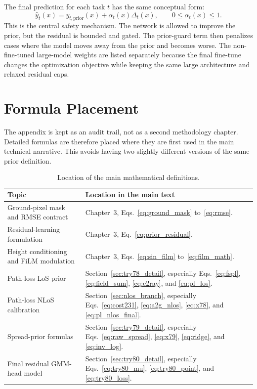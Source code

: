 The final prediction for each task \(t\) has the same conceptual form:
\[
  \hat y_t(x) = y_{t,\mathrm{prior}}(x) + \alpha_t(x)\Delta_t(x),
  \qquad 0 \le \alpha_t(x) \le 1.
\]
This is the central safety mechanism. The network is allowed to improve the
prior, but the residual is bounded and gated. The prior-guard term then
penalizes cases where the model moves away from the prior and becomes worse.
The non-fine-tuned large-model weights are listed separately because the final
fine-tune changes the optimization objective while keeping the same large
architecture and relaxed residual caps.

\chapter{Formula Placement}

The appendix is kept as an audit trail, not as a second methodology chapter.
Detailed formulas are therefore placed where they are first used in the main
technical narrative. This avoids having two slightly different versions of the
same prior definition.

\begin{table}[ht]
\centering
\caption{Location of the main mathematical definitions.}
\label{tab:formula_location_appendix}
\begin{tabularx}{\textwidth}{lX}
\toprule
Topic & Location in the main text \\
\midrule
Ground-pixel mask and RMSE contract &
Chapter~3, Eqs.~\ref{eq:ground_mask} to~\ref{eq:rmse}. \\
Residual-learning formulation &
Chapter~3, Eq.~\ref{eq:prior_residual}. \\
Height conditioning and FiLM modulation &
Chapter~3, Eqs.~\ref{eq:sin_film} to~\ref{eq:film_math}. \\
Path-loss LoS prior &
Section~\ref{sec:try78_detail}, especially Eqs.~\ref{eq:fspl},
\ref{eq:field_sum}, \ref{eq:c2ray}, and \ref{eq:pl_los}. \\
Path-loss NLoS calibration &
Section~\ref{sec:nlos_branch}, especially Eqs.~\ref{eq:cost231},
\ref{eq:a2g_nlos}, \ref{eq:x78}, and \ref{eq:pl_nlos_final}. \\
Spread-prior formulas &
Section~\ref{sec:try79_detail}, especially Eqs.~\ref{eq:raw_spread},
\ref{eq:x79}, \ref{eq:ridge}, and \ref{eq:inv_log}. \\
Final residual GMM-head model &
Section~\ref{sec:try80_detail}, especially Eqs.~\ref{eq:try80_mu},
\ref{eq:try80_point}, and \ref{eq:try80_loss}. \\
\bottomrule
\end{tabularx}
\end{table}

